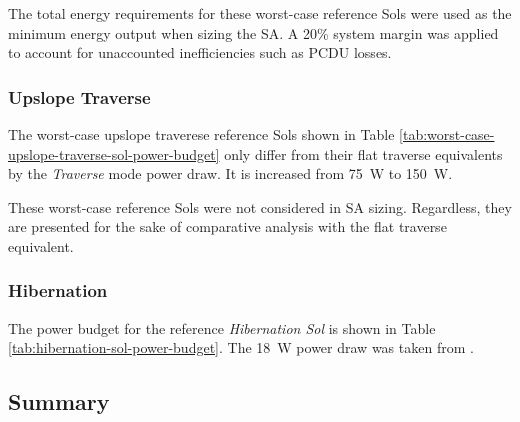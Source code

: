 

The total energy requirements for these worst-case reference Sols were used as the minimum energy output when sizing the \ac{SA}. A 20\% system margin was applied to account for unaccounted inefficiencies such as \ac{PCDU} losses.

\subsubsection{Upslope Traverse}
\label{sec:Design:PowerBudget:TraversePowerBudget:UpslopeTraverse}
The worst-case upslope traverese reference Sols shown in Table \ref{tab:worst-case-upslope-traverse-sol-power-budget} only differ from their flat traverse equivalents by the \textit{Traverse} mode power draw. It is increased from \SI{75}{\watt} to \SI{150}{\watt}.



These worst-case reference Sols were not considered in \ac{SA} sizing. Regardless, they are presented for the sake of comparative analysis with the flat traverse equivalent.


\subsubsection{Hibernation}
\label{sec:Design:PowerBudget:TraversePowerBudget:Hibernation}
The power budget for the reference \textit{Hibernation Sol} is shown in Table \ref{tab:hibernation-sol-power-budget}. The \SI{18}{\watt} power draw was taken from .



\subsection{Summary}
\label{sec:PowerBudget:Summary}
